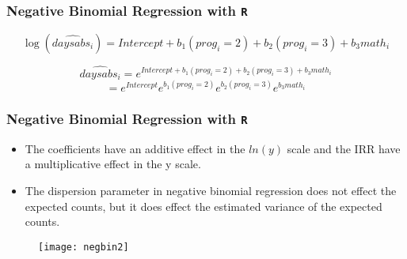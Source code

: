 \documentclass[MASTER.tex]{subfiles}
\begin{document}
\begin{frame}[fragile]
	\frametitle{Negative Binomial Regression with \texttt{R} }
	\Large

	\[ \log(\widehat{daysabs_i}) = Intercept + b_1(prog_i = 2) + b_2(prog_i = 3) + b_3math_i \] 

	\[ \widehat{daysabs_i} = e^{Intercept + b_1(prog_i = 2) + b_2(prog_i = 3) + b_3math_i}\]\[ = e^{Intercept}e^{b_1(prog_i = 2)}e^{b_2(prog_i = 3)}e^{b_3math_i} \]
\end{frame}
\begin{frame}
	\frametitle{Negative Binomial Regression with \texttt{R} }
	\Large
\begin{itemize}
\item The coefficients have an additive effect in the \(ln(y)\) scale and the IRR have a multiplicative effect 
in the y scale. 
\item The dispersion parameter in negative binomial regression does not effect the expected counts, 
but it does effect the estimated variance of the expected counts. 
\end{itemize}
\end{frame}	
	
%

\begin{frame}
\begin{figure}
		\centering
		\texttt{[image: negbin2]}
\end{figure}
	
\end{frame}
\end{document}
